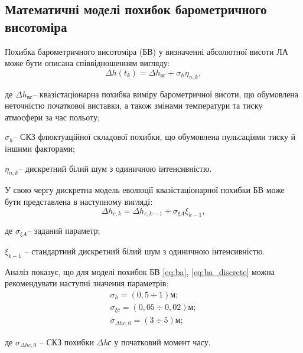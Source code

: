 \subsection{Математичні моделі похибок барометричного висотоміра}

Похибка барометричного висотоміра (БВ) у визначенні абсолютної висоти ЛА може бути 
описана співвідношенням вигляду:
\begin{equation}
 \label{eq:ba}
\Delta h(t_{k} )=\Delta h_{\text{вс}} +\sigma_{h} \eta_{n,k},               
\end{equation}

\begin{ESKDexplanation}
\item де $\Delta h_{\text{вс}}$-- квазістаціонарна похибка виміру барометричної висоти, що обумовлена 
неточністю початкової виставки, а також змінами температури та тиску атмосфери за 
час польоту;
\item $\sigma_{h} $-- СКЗ флюктуаційної складової похибки, що обумовлена пульсаціями 
тиску й іншими факторами;
\item $\eta_{n,k} $-- дискретний білий шум з одиничною інтенсивністю.
\end{ESKDexplanation}
У свою чергу дискретна модель еволюції квазістаціонарної похибки БВ може бути представлена 
в наступному вигляді:
\begin{equation}
\label{eq:ba_discrete}
\Delta h_{c,k} =\Delta h_{c,k-1} +\sigma_{\xi A} \xi_{k-1},                                       
\end{equation}
\begin{ESKDexplanation}
\item де  $\sigma_{\xi A} $-- заданий параметр; 
\item$\xi_{k-1} $ -- стандартний дискретний білий шум з одиничною інтенсивністю.
\end{ESKDexplanation}
Аналіз показує, що для моделі похибок БВ \eqref{eq:ba}, \eqref{eq:ba_discrete} 
можна рекомендувати наступні значення параметрів:
\[\begin{array}{l}
{\sigma_{h} =(0,5\div 1) \text{м};}\\
{\sigma_{\xi c} =(0,05\div 0,02) \text{м};}\\
{\sigma_{\Delta hc,0} =(3\div 5) \text{м};}
\end{array}\] 
\begin{ESKDexplanation}
\item де $\sigma_{\Delta hc,0} $ --  СКЗ похибки $\Delta $\textit{hс} у початковий момент часу.
\end{ESKDexplanation}



